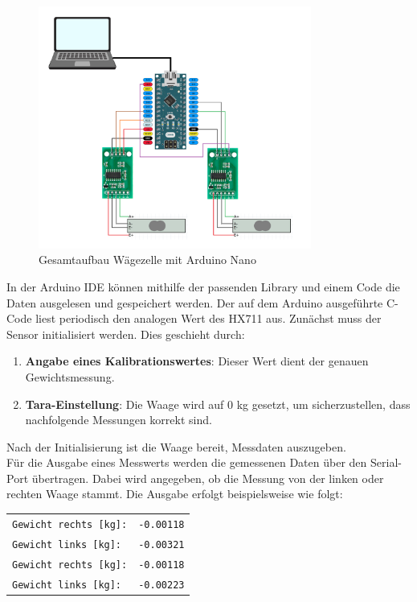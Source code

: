 \begin{figure}[h!]
    \centering
    \includegraphics[width=0.8\textwidth]{img/Schaltungs-Aufbau.png}
    \caption{Gesamtaufbau Wägezelle mit Arduino Nano}
    \label{Gesamtaufbau-waegezelle-mit-Arduino-Nano}
\end{figure}
In der Arduino IDE können mithilfe der passenden Library und einem Code die Daten ausgelesen und gespeichert werden.
Der auf dem Arduino ausgeführte C-Code liest periodisch den analogen Wert des HX711 aus. Zunächst muss der Sensor initialisiert werden. Dies geschieht durch:
\begin{enumerate}
    \item \textbf{Angabe eines Kalibrationswertes}: Dieser Wert dient der genauen Gewichtsmessung.
    \item \textbf{Tara-Einstellung}: Die Waage wird auf 0 kg gesetzt, um sicherzustellen, dass nachfolgende Messungen korrekt sind.
\end{enumerate}
Nach der Initialisierung ist die Waage bereit, Messdaten auszugeben.
\\
Für die Ausgabe eines Messwerts werden die gemessenen Daten über den Serial-Port übertragen.
Dabei wird angegeben, ob die Messung von der linken oder rechten Waage stammt.
Die Ausgabe erfolgt beispielsweise wie folgt:
\begin{center}
    \begin{tabular}{l r}
        \texttt{Gewicht rechts [kg]:} & \texttt{-0.00118} \\
        \texttt{Gewicht links [kg]:}  & \texttt{-0.00321} \\
        \texttt{Gewicht rechts [kg]:} & \texttt{-0.00118} \\
        \texttt{Gewicht links [kg]:}  & \texttt{-0.00223} \\
    \end{tabular}
\end{center}
